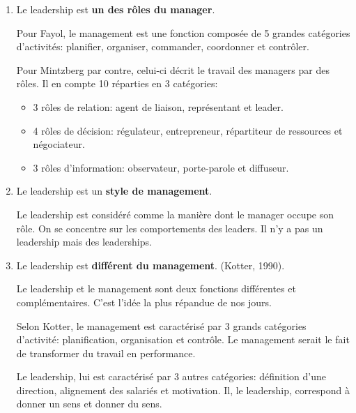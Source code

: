 \documentclass[12pt]{article}
\begin{document}
	\begin{enumerate}
	\item Le leadership est \textbf{un des rôles du manager}.\newline

	Pour Fayol, le management est une fonction composée de 5 grandes catégories d'activités: planifier, organiser, commander, coordonner et contrôler. \newline
	
	Pour Mintzberg par contre, celui-ci décrit le travail des managers par des rôles. Il en compte 10 réparties en 3 catégories:
		\begin{itemize}
		\item  3 rôles de relation: agent de liaison, représentant et leader.
		\item 4 rôles de décision: régulateur, entrepreneur, répartiteur de ressources et négociateur.
		\item 3 rôles d'information: observateur, porte-parole et diffuseur. \newline
		\end{itemize}
		
	\item Le leadership est un \textbf{style de management}. \newline
	
	Le leadership est considéré comme la manière dont le manager occupe son rôle. On se concentre sur les comportements des leaders. Il n'y a pas un leadership mais des leaderships. \newline
	
	\item Le leadership est \textbf{différent du management}. (Kotter, 1990). \newline
	
	Le leadership et le management sont deux fonctions différentes et complémentaires. C'est l'idée la plus répandue de nos jours. \newline
	
	Selon Kotter, le management est caractérisé par 3 grands catégories d'activité: planification, organisation et contrôle.
	Le management serait le fait de transformer du travail en performance. \newline
	
	Le leadership, lui est caractérisé par 3 autres catégories: définition d'une direction, alignement des salariés et motivation.
	Il, le leadership, correspond à donner un sens et donner du sens.
	\end{enumerate}
	
\end{document}
